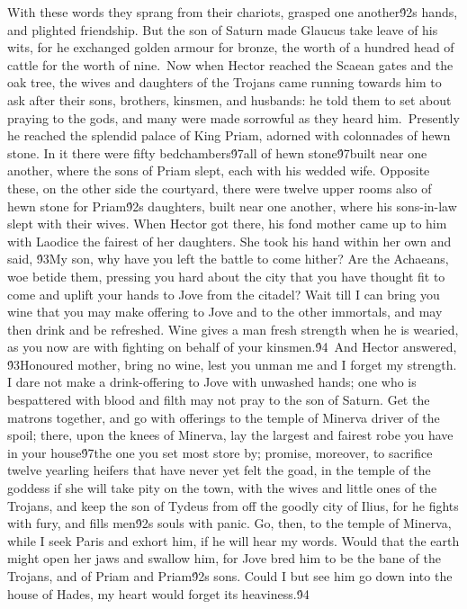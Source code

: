 {With these words they sprang from their chariots, grasped one another\'92s hands, and plighted friendship. But the son of Saturn made Glaucus take leave of his wits, for he exchanged golden armour for bronze, the worth of a hundred head of cattle for the worth of nine.\
Now when Hector reached the Scaean gates and the oak tree, the wives and daughters of the Trojans came running towards him to ask after their sons, brothers, kinsmen, and husbands: he told them to set about praying to the gods, and many were made sorrowful as they heard him.\
Presently he reached the splendid palace of King Priam, adorned with colonnades of hewn stone. In it there were fifty bedchambers\'97all of hewn stone\'97built near one another, where the sons of Priam slept, each with his wedded wife. Opposite these, on the other side the courtyard, there were twelve upper rooms also of hewn stone for Priam\'92s daughters, built near one another, where his sons-in-law slept with their wives. When Hector got there, his fond mother came up to him with Laodice the fairest of her daughters. She took his hand within her own and said, \'93My son, why have you left the battle to come hither? Are the Achaeans, woe betide them, pressing you hard about the city that you have thought fit to come and uplift your hands to Jove from the citadel? Wait till I can bring you wine that you may make offering to Jove and to the other immortals, and may then drink and be refreshed. Wine gives a man fresh strength when he is wearied, as you now are with fighting on behalf of your kinsmen.\'94\
And Hector answered, \'93Honoured mother, bring no wine, lest you unman me and I forget my strength. I dare not make a drink-offering to Jove with unwashed hands; one who is bespattered with blood and filth may not pray to the son of Saturn. Get the matrons together, and go with offerings to the temple of Minerva driver of the spoil; there, upon the knees of Minerva, lay the largest and fairest robe you have in your house\'97the one you set most store by; promise, moreover, to sacrifice twelve yearling heifers that have never yet felt the goad, in the temple of the goddess if she will take pity on the town, with the wives and little ones of the Trojans, and keep the son of Tydeus from off the goodly city of Ilius, for he fights with fury, and fills men\'92s souls with panic. Go, then, to the temple of Minerva, while I seek Paris and exhort him, if he will hear my words. Would that the earth might open her jaws and swallow him, for Jove bred him to be the bane of the Trojans, and of Priam and Priam\'92s sons. Could I but see him go down into the house of Hades, my heart would forget its heaviness.\'94\
}
